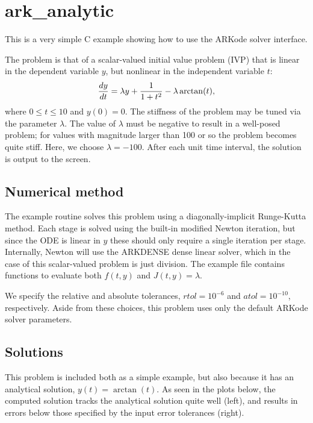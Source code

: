 \documentclass[letterpaper,10pt,english]{sphinxmanual}
\begin{document}
\section{ark\_analytic}
\label{c_serial:ark-analytic}\label{c_serial:id1}
This is a very simple C example showing how to use the ARKode solver
interface.

The problem is that of a scalar-valued initial value problem (IVP)
that is linear in the dependent variable \(y\), but nonlinear in
the independent variable \(t\):
\begin{gather}
\begin{split}\frac{dy}{dt} = \lambda y + \frac{1}{1+t^2} - \lambda \arctan(t),\end{split}\notag
\end{gather}
where \(0\le t\le 10\) and \(y(0)=0\).  The stiffness of the
problem may be tuned via the parameter \(\lambda\).  The value of
\(\lambda\) must be negative to result in a well-posed problem;
for values with magnitude larger than 100 or so the problem becomes
quite stiff.  Here, we choose \(\lambda=-100\).  After each unit
time interval, the solution is output to the screen.


\subsection{Numerical method}
\label{c_serial:numerical-method}
The example routine solves this problem using a diagonally-implicit
Runge-Kutta method.  Each stage is solved using the built-in modified
Newton iteration, but since the ODE is linear in \(y\) these
should only require a single iteration per stage.  Internally, Newton
will use the ARKDENSE dense linear solver, which in the case of this
scalar-valued problem is just division.  The example file contains
functions to evaluate both \(f(t,y)\) and \(J(t,y)=\lambda\).

We specify the relative and absolute tolerances, \(rtol=10^{-6}\)
and \(atol=10^{-10}\), respectively.  Aside from these choices,
this problem uses only the default ARKode solver parameters.


\subsection{Solutions}
\label{c_serial:solutions}
This problem is included both as a simple example, but also because it
has an analytical solution, \(y(t) = \arctan(t)\).  As seen in the
plots below, the computed solution tracks the analytical solution
quite well (left), and results in errors below those specified by the input
error tolerances (right).
\end{document}
